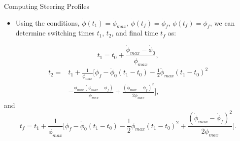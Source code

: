 \documentclass{beamer}
\begin{document}
%
%
\begin{frame}{Computing Steering Profiles}

\begin{block}{ }
\begin{itemize}
\item Using the conditions, $\dot{\phi}(t_1)=\dot{\phi}_{max}$, $\dot{\phi}(t_f)=\dot{\phi}_f$, $\phi(t_f)=\phi_f$, we can determine switching times $t_1$, $t_2$, and final time $t_f$ as:
\end{itemize}
 \begin{equation}\label{t1cons}
t_1=t_0+\frac{\dot{\phi}_{max}-\dot{\phi}_0}{\ddot{\phi}_{max}},
 \end{equation}
 \begin{equation}\label{t2cons}
 \begin{split}
 t_2=&t_1+\frac{1}{\dot{\phi}_{max}}\Big[ \phi_f-\dot{\phi}_0(t_1-t_0)-\frac{1}{2}\ddot{\phi}_{max}(t_1-t_0)^2\\
 &-\frac{\dot{\phi}_{max}(\dot{\phi}_{max}-\dot{\phi}_f)}{\ddot{\phi}_{max}}+\frac{(\dot{\phi}_{max}-\dot{\phi}_f)^2}{2\ddot{\phi}_{max}} \Big],
 \end{split}
 \end{equation}
and
  \begin{equation}\label{tfcons}
 t_f=t_1+\frac{1}{\dot{\phi}_{max}}\Big[ \phi_f-\dot{\phi}_0(t_1-t_0)-\frac{1}{2}\ddot{\phi}_{max}(t_1-t_0)^2+\frac{(\dot{\phi}_{max}-\dot{\phi}_f)^2}{2\ddot{\phi}_{max}} \Big].
 \end{equation}
\end{block}
\end{frame}
\end{document}
